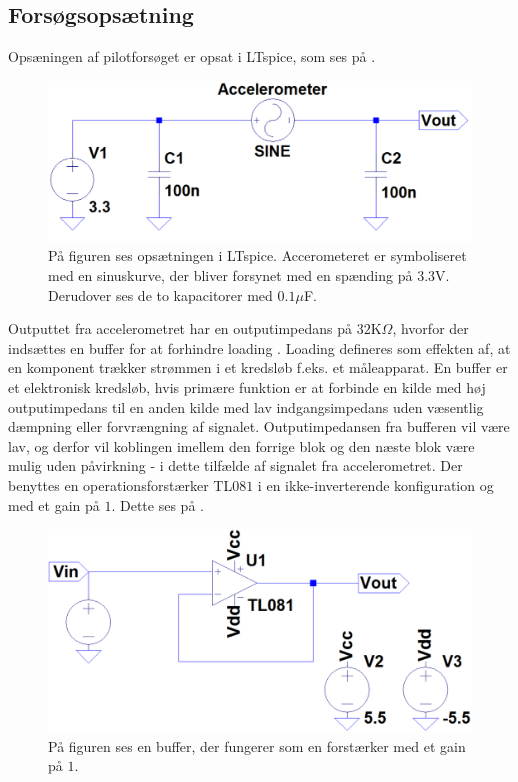 \subsection{Forsøgsopsætning}
Opsæningen af pilotforsøget er opsat i LTspice, som ses på .  

\begin{figure}[H]
		\centering
		\includegraphics[scale=0.4]{figures/Bilag/Test_opsaetning.PNG}
		\caption{På figuren ses opsætningen i LTspice. Accerometeret er symboliseret med en sinuskurve, der bliver forsynet med en spænding på $3.3$V. Derudover ses de to kapacitorer med $0.1\mu$F.}
		\label{pLTspice}
\end{figure}

\noindent Outputtet fra accelerometret har en outputimpedans på $32$K$\Omega$, hvorfor der indsættes en buffer for at forhindre loading \cite{Devices2009}. Loading defineres som effekten af, at en komponent trækker strømmen i et kredsløb f.eks. et måleapparat. En buffer er et elektronisk kredsløb, hvis primære funktion er at forbinde en kilde med høj outputimpedans til en anden kilde med lav indgangsimpedans uden væsentlig dæmpning eller forvrængning af signalet. Outputimpedansen fra bufferen vil være lav, og derfor vil koblingen imellem den forrige blok og den næste blok være mulig uden påvirkning - i dette tilfælde af signalet fra accelerometret. Der benyttes en operationsforstærker TL$081$ i en ikke-inverterende konfiguration og med et gain på $1$. \cite{Schaumann2014} Dette ses på .
\begin{figure}[H]
	\centering
	\includegraphics[scale=0.4]{figures/cProblemloesning/Buffer_LT.png}
	\caption{På figuren ses en buffer, der fungerer som en forstærker med et gain på $1$.}
	\label{fig:Buffer}
\end{figure}

